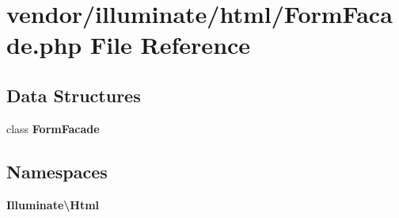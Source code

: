 \section{vendor/illuminate/html/\+Form\+Facade.php File Reference}
\label{_form_facade_8php}
\subsection*{Data Structures}
\begin{DoxyCompactItemize}
\item 
class {\bf Form\+Facade}
\end{DoxyCompactItemize}
\subsection*{Namespaces}
\begin{DoxyCompactItemize}
\item 
 {\bf Illuminate\textbackslash{}\+Html}
\end{DoxyCompactItemize}
